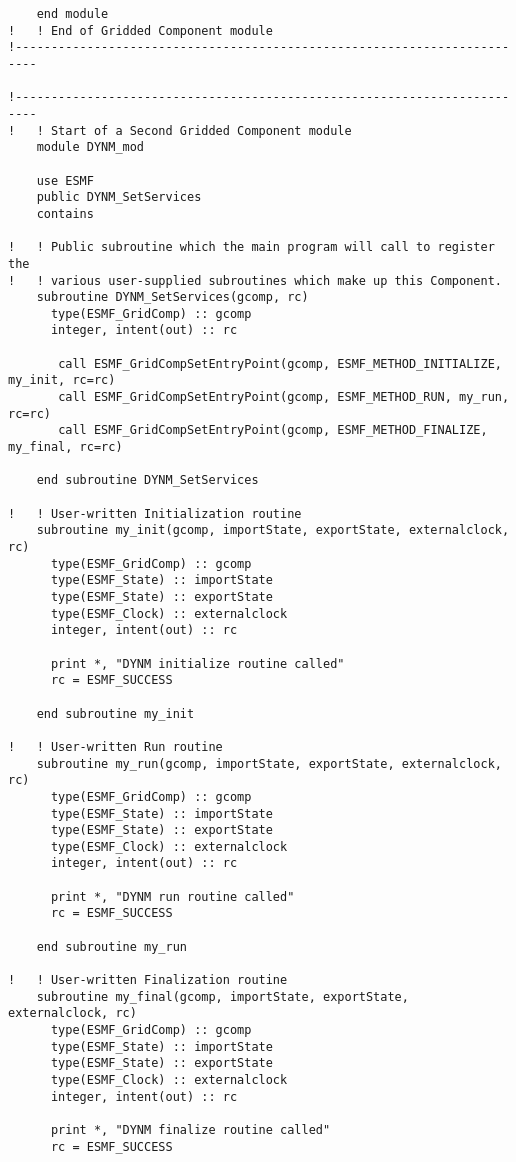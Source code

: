 \begin{verbatim}
    end module
!   ! End of Gridded Component module
!-------------------------------------------------------------------------

!-------------------------------------------------------------------------
!   ! Start of a Second Gridded Component module
    module DYNM_mod

    use ESMF
    public DYNM_SetServices
    contains

!   ! Public subroutine which the main program will call to register the
!   ! various user-supplied subroutines which make up this Component.
    subroutine DYNM_SetServices(gcomp, rc)
      type(ESMF_GridComp) :: gcomp
      integer, intent(out) :: rc

       call ESMF_GridCompSetEntryPoint(gcomp, ESMF_METHOD_INITIALIZE, my_init, rc=rc)
       call ESMF_GridCompSetEntryPoint(gcomp, ESMF_METHOD_RUN, my_run, rc=rc)
       call ESMF_GridCompSetEntryPoint(gcomp, ESMF_METHOD_FINALIZE, my_final, rc=rc)
      
    end subroutine DYNM_SetServices
      
!   ! User-written Initialization routine
    subroutine my_init(gcomp, importState, exportState, externalclock, rc)
      type(ESMF_GridComp) :: gcomp
      type(ESMF_State) :: importState
      type(ESMF_State) :: exportState
      type(ESMF_Clock) :: externalclock
      integer, intent(out) :: rc

      print *, "DYNM initialize routine called"
      rc = ESMF_SUCCESS

    end subroutine my_init

!   ! User-written Run routine
    subroutine my_run(gcomp, importState, exportState, externalclock, rc)
      type(ESMF_GridComp) :: gcomp
      type(ESMF_State) :: importState
      type(ESMF_State) :: exportState
      type(ESMF_Clock) :: externalclock
      integer, intent(out) :: rc

      print *, "DYNM run routine called"
      rc = ESMF_SUCCESS

    end subroutine my_run

!   ! User-written Finalization routine
    subroutine my_final(gcomp, importState, exportState, externalclock, rc)
      type(ESMF_GridComp) :: gcomp
      type(ESMF_State) :: importState
      type(ESMF_State) :: exportState
      type(ESMF_Clock) :: externalclock
      integer, intent(out) :: rc

      print *, "DYNM finalize routine called"
      rc = ESMF_SUCCESS


\end{verbatim}
